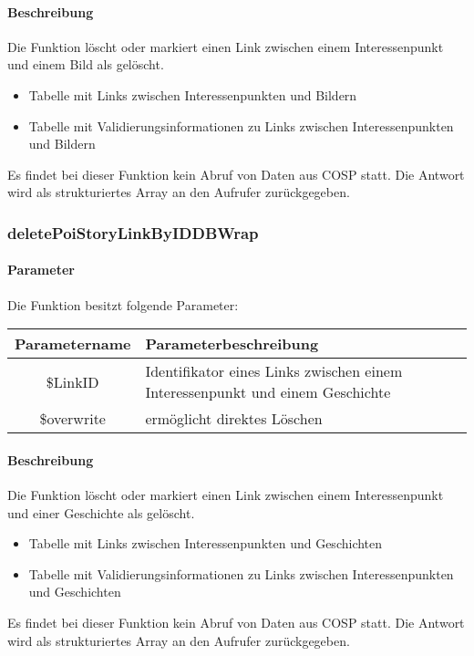 \paragraph{Beschreibung} Die Funktion löscht oder markiert einen Link zwischen einem Interessenpunkt und einem Bild als gelöscht.
\begin{itemize}
	\item Tabelle mit Links zwischen Interessenpunkten und Bildern
	\item Tabelle mit Validierungsinformationen zu Links zwischen Interessenpunkten und Bildern
\end{itemize}
Es findet bei dieser Funktion kein Abruf von Daten aus {\glqq COSP\grqq} statt. Die Antwort wird als strukturiertes Array an den Aufrufer zurückgegeben.
\subsubsection{deletePoiStoryLinkByIDDBWrap}
\paragraph{Parameter} Die Funktion besitzt folgende Parameter:
\begin{table}[H]
	\begin{tabular}{|c|p{11cm}|}
		\hline
		\textbf{Parametername} & \textbf{Parameterbeschreibung} \\ \hline
		\$LinkID    & Identifikator eines Links zwischen einem Interessenpunkt und einem Geschichte \\ \hline
		\$overwrite & ermöglicht direktes Löschen \\ \hline
	\end{tabular}
\end{table}
\paragraph{Beschreibung} Die Funktion löscht oder markiert einen Link zwischen einem Interessenpunkt und einer Geschichte als gelöscht.
\begin{itemize}
	\item Tabelle mit Links zwischen Interessenpunkten und Geschichten
	\item Tabelle mit Validierungsinformationen zu Links zwischen Interessenpunkten und Geschichten
\end{itemize}
Es findet bei dieser Funktion kein Abruf von Daten aus {\glqq COSP\grqq} statt. Die Antwort wird als strukturiertes Array an den Aufrufer zurückgegeben.
